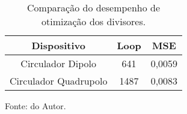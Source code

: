 



\begin{table}[H]
    \centering
    \caption{Comparação do desempenho de otimização dos divisores.}
\begin{tabular}{ccc}
\hline
Dispositivo           & Loop & MSE    \\ \hline
Circulador Dipolo     & 641  & 0,0059 \\
Circulador Quadrupolo & 1487 & 0,0083 \\ \hline
\end{tabular}

    \label{tab: MSECirculador}

    \vspace{2.5mm}
    Fonte: do Autor.

\end{table}